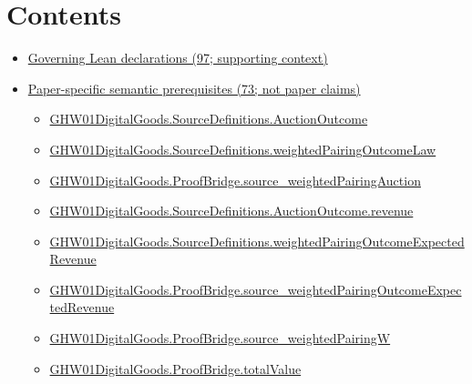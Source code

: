 \documentclass[10pt]{article}
\begin{document}
\section*{Contents}
\begin{itemize}[leftmargin=1.2em]
\item \hyperlink{governing-declaration-section-5ef5ef0364b6939c}{Governing Lean declarations (97; supporting context)}
\item \hyperlink{paper-prerequisite-section-5ef5ef0364b6939c}{Paper-specific semantic prerequisites (73; not paper claims)}
\begin{itemize}[leftmargin=1.2em]
\item \hyperlink{paper-prerequisite-fc173e8d557afd08}{GHW01\allowbreak{}Digital\allowbreak{}Goods.\allowbreak{}Source\allowbreak{}Definitions.\allowbreak{}Auction\allowbreak{}Outcome}
\item \hyperlink{paper-prerequisite-39e9afafcadf8012}{GHW01\allowbreak{}Digital\allowbreak{}Goods.\allowbreak{}Source\allowbreak{}Definitions.\allowbreak{}weighted\allowbreak{}Pairing\allowbreak{}Outcome\allowbreak{}Law}
\item \hyperlink{paper-prerequisite-6f68719796bc0bd6}{GHW01\allowbreak{}Digital\allowbreak{}Goods.\allowbreak{}Proof\allowbreak{}Bridge.\allowbreak{}source\_\allowbreak{}weighted\allowbreak{}Pairing\allowbreak{}Auction}
\item \hyperlink{paper-prerequisite-db810689ed4c35ca}{GHW01\allowbreak{}Digital\allowbreak{}Goods.\allowbreak{}Source\allowbreak{}Definitions.\allowbreak{}Auction\allowbreak{}Outcome.\allowbreak{}revenue}
\item \hyperlink{paper-prerequisite-11769b7a8f4d665e}{GHW01\allowbreak{}Digital\allowbreak{}Goods.\allowbreak{}Source\allowbreak{}Definitions.\allowbreak{}weighted\allowbreak{}Pairing\allowbreak{}Outcome\allowbreak{}Expected\allowbreak{}Revenue}
\item \hyperlink{paper-prerequisite-acbced5093bede01}{GHW01\allowbreak{}Digital\allowbreak{}Goods.\allowbreak{}Proof\allowbreak{}Bridge.\allowbreak{}source\_\allowbreak{}weighted\allowbreak{}Pairing\allowbreak{}Outcome\allowbreak{}Expected\allowbreak{}Revenue}
\item \hyperlink{paper-prerequisite-c71e64dfa99cbe75}{GHW01\allowbreak{}Digital\allowbreak{}Goods.\allowbreak{}Proof\allowbreak{}Bridge.\allowbreak{}source\_\allowbreak{}weighted\allowbreak{}Pairing\allowbreak{}W}
\item \hyperlink{paper-prerequisite-1dad2de1fe153716}{GHW01\allowbreak{}Digital\allowbreak{}Goods.\allowbreak{}Proof\allowbreak{}Bridge.\allowbreak{}total\allowbreak{}Value}

\end{itemize}
\end{itemize}
\end{document}
